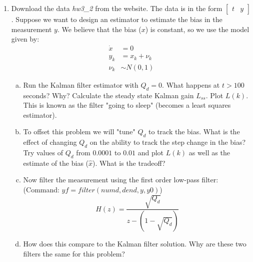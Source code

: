 \documentclass[10pt]{article}
\begin{document}
\begin{enumerate}[label=\textbf{\arabic*.}]
  \vspace{24pt}

  \item Download the data \emph{hw3\_2} from the website. The data is in the 
  form $\begin{bmatrix} t & y \end{bmatrix}$. Suppose we want to design an 
  estimator to estimate the bias in the measurement $y$. We believe that the 
  bias ($x$) is constant, so we use the model given by:
  \begin{equation*}
    \begin{split}
      \dot{x} &= 0 \\
      y_k &= x_k + \nu_k \\
      \nu_k &\sim N(0,1)
    \end{split}
  \end{equation*}
  \begin{enumerate}[(a)]
    \itemsep -2pt 
    \item Run the Kalman filter estimator with $Q_d = 0$. What happens at 
    $t > 100$ seconds? Why? Calculate the steady state Kalman gain $L_{ss}$. 
    Plot $L(k)$. This is known as the filter "going to sleep" (becomes a least 
    squares estimator).

    \item To offset this problem we will "tune" $Q_d$ to track the bias. What is 
    the effect of changing $Q_d$ on the ability to track the step change in the 
    bias? Try values of $Q_d$ from $0.0001$ to $0.01$ and plot $L(k)$ as well 
    as the estimate of the bias ($\hat{x}$). What is the tradeoff?

    \item Now filter the measurement using the first order low-pass filter: \\
    (Command: $yf = filter(numd, dend, y, y0)$)
    \begin{equation*}
      H(z) = \dfrac{\sqrt{Q_d}}{z - (1-\sqrt{Q_d})}
    \end{equation*}

    \item How does this compare to the Kalman filter solution. Why are these two 
    filters the same for this problem?
  \end{enumerate}
  \vspace{10pt}


\end{enumerate}
\end{document}

